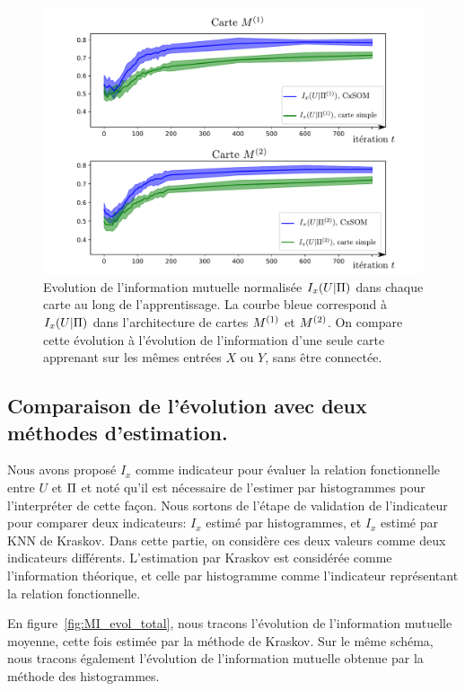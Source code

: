 \begin{figure}
\includegraphics[width=\textwidth]{evolution_MI_binning}
\caption{Evolution de l'information mutuelle normalisée $I_x(U|\Pi)$ dans chaque carte au long de l'apprentissage. La courbe bleue correspond à $I_x(U|\Pi)$ dans l'architecture de cartes $M^{({1})}$ et $M^{({2})}$. On compare cette évolution à l'évolution de l'information d'une seule carte apprenant sur les mêmes entrées $X$ ou $Y$, sans être connectée.}
\label{fig:MI_evol}
\end{figure}

\subsection{Comparaison de l'évolution avec deux méthodes d'estimation.}

Nous avons proposé $I_x$ comme indicateur pour évaluer la relation fonctionnelle entre $U$ et $\Pi$ et noté qu'il est nécessaire de l'estimer par histogrammes pour l'interpréter de cette façon.
Nous sortons de l'étape de validation de l'indicateur pour comparer deux indicateurs: $I_x$ estimé par histogrammes, et $I_x$ estimé par KNN de Kraskov. Dans cette partie, on considère ces deux valeurs comme deux indicateurs différents. L'estimation par Kraskov est considérée comme l'information théorique, et celle par histogramme comme l'indicateur représentant la relation fonctionnelle.

En figure~\ref{fig:MI_evol_total}, nous tracons l'évolution de l'information mutuelle moyenne, cette fois estimée par la méthode de Kraskov. Sur le même schéma, nous tracons également l'évolution de l'information mutuelle obtenue par la méthode des histogrammes. 

